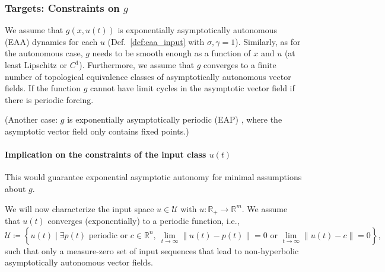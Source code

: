 \documentclass{article}
\newcommand{\ascomment}[1]{\textcolor{ascolor}{(#1)}}
\theoremstyle{definition} \newtheorem{definition}{Definition}
\theoremstyle{remark} \newtheorem{remark}{Remark}
\newcommand{\reals}{\mathbb{R}}
\newcounter{ct}
\begin{document}




\subsubsection{Targets: Constraints on $g$}\label{sec:input_target}



We assume that $g(x,u(t))$ is exponentially asymptotically autonomous (EAA) dynamics for each $u$ (Def.~\ref{def:eaa_input} with $\sigma,\gamma=1$). %
Similarly, as for the autonomous case, $g$ needs to be smooth enough as a function of $x$ and $u$ (at least Lipschitz or $C^1$). %
Furthermore, we assume that $g$ converges to a finite number of topological equivalence classes of asymptotically autonomous vector fields. %
If the function $g$ cannot have limit cycles  in the asymptotic vector field  if there is periodic forcing.

\ascomment{Another case: $g$ is exponentially asymptotically periodic (EAP) \label{sec:eea_input_periodic}, where the asymptotic vector field only contains  fixed points.}


\paragraph{Implication on the constraints of the input class $u(t)$}
This would guarantee exponential asymptotic autonomy for minimal assumptions about $g$. %

We will now characterize the input space 
$u\in \mathcal{U}$ with $u:\reals_+\rightarrow\reals^m$.
We assume that $u(t)$ converges (exponentially) to a periodic function, i.e., %
\begin{equation}
\mathcal{U} \coloneqq \left\{ u(t) \mid \exists p(t) \text{ periodic} \text{ or } c \in \mathbb{R}^n, \ \lim_{t \to \infty} \| u(t) - p(t) \| = 0 \text{ or } \lim_{t \to \infty} \| u(t) - c \| = 0 \right\},
\end{equation}
such that only a measure-zero set of input sequences that lead to non-hyperbolic asymptotically autonomous vector fields.
\end{document}

